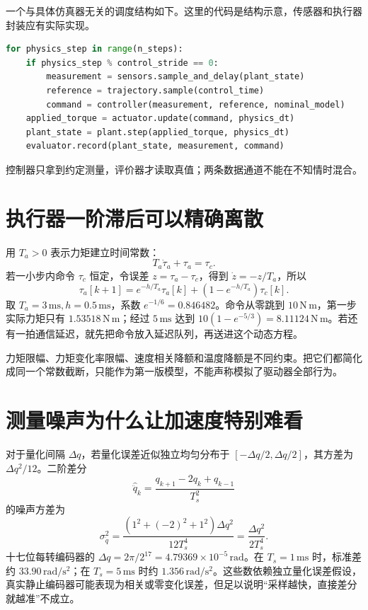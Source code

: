 一个与具体仿真器无关的调度结构如下。这里的代码是结构示意，传感器和执行器封装应有实际实现。
\begin{lstlisting}[language=Python]
for physics_step in range(n_steps):
    if physics_step % control_stride == 0:
        measurement = sensors.sample_and_delay(plant_state)
        reference = trajectory.sample(control_time)
        command = controller(measurement, reference, nominal_model)
    applied_torque = actuator.update(command, physics_dt)
    plant_state = plant.step(applied_torque, physics_dt)
    evaluator.record(plant_state, measurement, command)
\end{lstlisting}
控制器只拿到约定测量，评价器才读取真值；两条数据通道不能在不知情时混合。

\section{执行器一阶滞后可以精确离散}

用 $T_a>0$ 表示力矩建立时间常数：
\begin{equation}
T_a\dot\tau_a+\tau_a=\tau_c.
\end{equation}
若一小步内命令 $\tau_c$ 恒定，令误差 $z=\tau_a-\tau_c$，得到 $\dot z=-z/T_a$，所以
\begin{equation}
\tau_a[k+1]=e^{-h/T_a}\tau_a[k]+(1-e^{-h/T_a})\tau_c[k].
\end{equation}
取 $T_a=3\,\mathrm{ms},h=0.5\,\mathrm{ms}$，系数 $e^{-1/6}=0.846482$。命令从零跳到 $10\,\mathrm{N\,m}$，第一步实际力矩只有 $1.53518\,\mathrm{N\,m}$；经过 $5\,\mathrm{ms}$ 达到 $10(1-e^{-5/3})=8.11124\,\mathrm{N\,m}$。若还有一拍通信延迟，就先把命令放入延迟队列，再送进这个动态方程。

力矩限幅、力矩变化率限幅、速度相关降额和温度降额是不同约束。把它们都简化成同一个常数截断，只能作为第一版模型，不能声称模拟了驱动器全部行为。

\section{测量噪声为什么让加速度特别难看}

对于量化间隔 $\Delta q$，若量化误差近似独立均匀分布于 $[-\Delta q/2,\Delta q/2]$，其方差为 $\Delta q^2/12$。二阶差分
\begin{equation}
\hat{\ddot q}_k=\frac{q_{k+1}-2q_k+q_{k-1}}{T_s^2}
\end{equation}
的噪声方差为
\begin{equation}
\sigma_{\ddot q}^2=\frac{(1^2+(-2)^2+1^2)\Delta q^2}{12T_s^4}
=\frac{\Delta q^2}{2T_s^4}.
\end{equation}
十七位每转编码器的 $\Delta q=2\pi/2^{17}=4.79369\times10^{-5}\,\mathrm{rad}$。在 $T_s=1\,\mathrm{ms}$ 时，标准差约 $33.90\,\mathrm{rad/s^2}$；在 $T_s=5\,\mathrm{ms}$ 时约 $1.356\,\mathrm{rad/s^2}$。这些数依赖独立量化误差假设，真实静止编码器可能表现为相关或零变化误差，但足以说明“采样越快，直接差分就越准”不成立。

